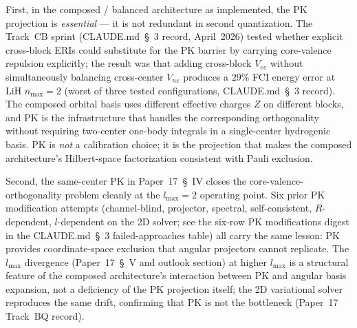 \documentclass[11pt]{article}
\begin{document}
First, in the composed / balanced architecture as implemented, the PK
projection is \emph{essential} --- it is not redundant in second
quantization.  The Track~CB sprint (CLAUDE.md~\S~3 record, April~2026)
tested whether explicit cross-block ERIs could substitute for the PK
barrier by carrying core-valence repulsion explicitly; the result was
that adding cross-block $V_{ee}$ without simultaneously balancing
cross-center $V_{ne}$ produces a $29\%$ FCI energy error at LiH
$n_\text{max}=2$ (worst of three tested configurations, CLAUDE.md~\S~3
record).  The composed orbital basis uses different effective charges
$Z$ on different blocks, and PK is the infrastructure that handles
the corresponding orthogonality without requiring two-center one-body
integrals in a single-center hydrogenic basis.  PK is \emph{not} a
calibration choice; it is the projection that makes the composed
architecture's Hilbert-space factorization consistent with Pauli
exclusion.

Second, the same-center PK in
Paper~17~\S~IV \cite{paper17} closes the
core-valence-orthogonality problem cleanly at the $l_\text{max} = 2$
operating point.  Six prior PK modification attempts
(channel-blind, projector, spectral, self-consistent, $R$-dependent,
$l$-dependent on the 2D solver; see the
six-row PK modifications digest in the CLAUDE.md~\S~3
failed-approaches table) all carry the same lesson:
PK provides coordinate-space exclusion that angular projectors cannot
replicate.  The $l_\text{max}$ divergence (Paper~17~\S~V
and outlook section) at higher $l_\text{max}$ is a structural feature
of the composed architecture's interaction between PK and angular
basis expansion, not a deficiency of the PK projection itself; the
2D variational solver reproduces the same drift, confirming that PK
is not the bottleneck (Paper~17 Track~BQ record).
\end{document}
